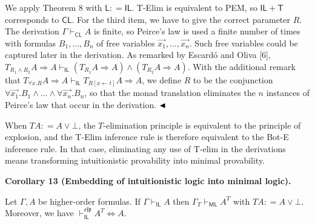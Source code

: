 We apply Theorem 8 with $\mathsf{L}\mathrel{\mathop{:}}=\mathsf{IL}$. T-Elim is equivalent to PEM, so $\mathsf{IL}+\mathsf{T}$ corresponds to $\mathsf{CL}$. For the third item, we have to give the correct parameter $R$. The derivation $\Gamma\vdash_{\mathsf{CL}}A$ is finite, so Peirce’s law is used a finite number of times with formulas $B_{1},\ldots,B_{n}$ of free variables $\vec{x_{1}},\ldots,\vec{x_{n}}$. Such free variables could be captured later in the derivation. As remarked by Escardó and Oliva [6], $T_{R_{1}\mathbin{\wedge}R_{2}}A\mathbin{\Rightarrow}A\vdash_{\mathsf{IL}}(T_{R_{1}}A\mathbin{\Rightarrow}A)\mathbin{\wedge}(T_{R_{2}}A\mathbin{\Rightarrow}A)$. With the additional remark that $T_{{\forall}x.R}A\mathbin{\Rightarrow}A\vdash_{\mathsf{IL}}T_{R[x\leftarrow t]}A\mathbin{\Rightarrow}A$, we define $R$ to be the conjunction ${\forall}\vec{x_{1}}.B_{1}\mathbin{\wedge}\ldots\mathbin{\wedge}{\forall}\vec{x_{n}}.B_{n}$, so that the monad translation eliminates the $n$ instances of Peirce’s law that occur in the derivation. $\hfill\blacktriangleleft$\par
 
 
 
When $TA\mathrel{\mathop{:}}=A\mathbin{\vee}\bot$, the $T$-elimination principle is equivalent to the principle of explosion, and the T-Elim inference rule is therefore equivalent to the Bot-E inference rule. In that case, eliminating any use of T-elim in the derivations means transforming intuitionistic provability into minimal provability.\par
 
 
 
\par\medskip\noindent\textbf{Corollary 13 (Embedding of intuitionistic logic into minimal logic).}\par
 
 
Let $\Gamma,A$ be higher-order formulas. If $\Gamma\vdash_{\mathsf{IL}}A$ then $\Gamma_{T}\vdash_{\mathsf{ML}}A^{T}$ with $TA\mathrel{\mathop{:}}=A\mathbin{\vee}\bot$. Moreover, we have $\vdash_{\mathsf{IL}}^{\mathfrak{e}\mathfrak{f}\mathfrak{p}}A^{T}\Leftrightarrow
A$.\par
 
 
 
